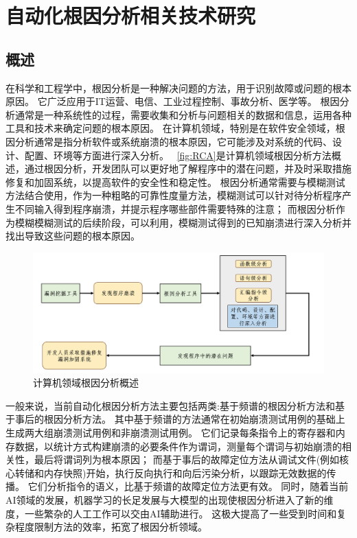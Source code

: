 \cleardoublepage
\section{自动化根因分析相关技术研究}        %
\subsection{概述}
在科学和工程学中，根因分析是一种解决问题的方法，用于识别故障或问题的根本原因。
它广泛应用于IT运营、电信、工业过程控制、事故分析、医学等。
根因分析通常是一种系统性的过程，需要收集和分析与问题相关的数据和信息，运用各种工具和技术来确定问题的根本原因。
在计算机领域，特别是在软件安全领域，根因分析通常是指分析软件或系统崩溃的根本原因，它可能涉及对系统的代码、设计、配置、环境等方面进行深入分析。
~\autoref{fig:RCA}是计算机领域根因分析方法概述，通过根因分析，开发团队可以更好地了解程序中的潜在问题，并及时采取措施修复和加固系统，以提高软件的安全性和稳定性。
根因分析通常需要与模糊测试方法结合使用，作为一种粗略的可靠性度量方法，模糊测试可以针对待分析程序产生不同输入得到程序崩溃，并提示程序哪些部件需要特殊的注意；
而根因分析作为模糊模糊测试的后续阶段，可以利用，模糊测试得到的已知崩溃进行深入分析并找出导致这些问题的根本原因。
\begin{figure}[h]
    \centering
    \includegraphics[width=1.0\textwidth]{./figure/RCA.png}
    \caption{计算机领域根因分析概述}
    \label{fig:RCA}
\end{figure}

一般来说，当前自动化根因分析方法主要包括两类:基于频谱的根因分析方法和基于事后的根因分析方法。
其中基于频谱的方法通常在初始崩溃测试用例的基础上生成两大组崩溃测试用例和非崩溃测试用例。
它们记录每条指令上的寄存器和内存数据，以统计方式构建崩溃的必要条件作为谓词，测量每个谓词与初始崩溃的相关性，最后将谓词列为根本原因；
而基于事后的故障定位方法从调试文件(例如核心转储和内存快照)开始，执行反向执行和向后污染分析，以跟踪无效数据的传播。
它们分析指令的语义，比基于频谱的故障定位方法更有效。
同时，随着当前AI领域的发展，机器学习的长足发展与大模型的出现使根因分析进入了新的维度，一些繁杂的人工工作可以交由AI辅助进行。
这极大提高了一些受到时间和复杂程度限制方法的效率，拓宽了根因分析领域。

